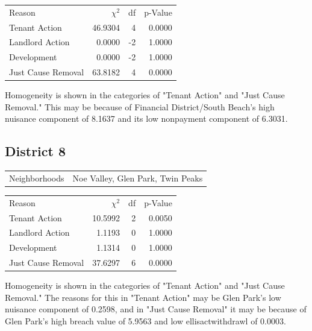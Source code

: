 \documentclass[]{article}
\begin{document}
\begin {table}[!h]
\centering
\begin{tabular}{l | r | r | r}
	
	Reason				 &  $\chi ^{2}$ & df & p-Value \\
	Tenant Action 		   &  46.9304  & 4  & 0.0000 \\
	Landlord Action	       &  0.0000  & -2  & 1.0000 \\
	Development			   &  0.0000  & -2  & 1.0000 \\
	Just Cause Removal	   &  63.8182  & 4  & 0.0000 \\
\end{tabular} \newline
\end{table}
\FloatBarrier

Homogeneity is shown in the categories of "Tenant Action" and "Just Cause Removal." This may be because of Financial District/South Beach's high nuisance component of 8.1637 and its low nonpayment component of 6.3031.

\subsection{District 8}

\begin{table}[!h]
	\centering
	\begin{tabular}{l | l}
		Neighborhoods & Noe Valley, Glen Park, Twin Peaks
	\end{tabular}
\end{table}
\FloatBarrier

\begin {table}[!h]
\centering
\begin{tabular}{l | r | r | r}
	
	Reason				 &  $\chi ^{2}$ & df & p-Value \\
	Tenant Action 		   &  10.5992  &  2 & 0.0050 \\
	Landlord Action	       &  1.1193  &  0 & 1.0000 \\
	Development			   &  1.1314  & 0  & 1.0000 \\
	Just Cause Removal	   &  37.6297  &  6 & 0.0000 \\
\end{tabular} \newline
\end{table}
\FloatBarrier

Homogeneity is shown in the categories of "Tenant Action" and "Just Cause Removal." The reasons for this in "Tenant Action" may be Glen Park's low nuisance component of 0.2598, and in "Just Cause Removal" it may be because of Glen Park's high breach value of 5.9563 and low ellisactwithdrawl of 0.0003.
\end{document}
